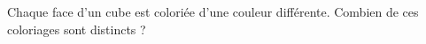 Chaque face d'un cube est coloriée d'une couleur différente. Combien de ces coloriages sont distincts ?
